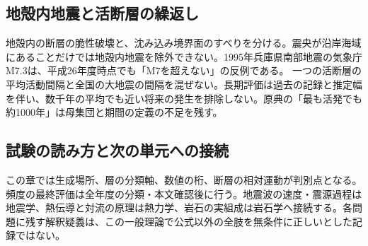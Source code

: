 \subsection{地殻内地震と活断層の繰返し}
\label{theory:interior:crust_quakes}
地殻内の断層の脆性破壊と、沈み込み境界面のすべりを分ける。震央が沿岸海域にあることだけでは地殻内地震を除外できない。1995年兵庫県南部地震の気象庁M7.3は、平成26年度時点でも「M7を超えない」の反例である。\cite{jma_hyogo_history}
一つの活断層の平均活動間隔と全国の大地震の間隔を混ぜない。長期評価は過去の記録と推定幅を伴い、数千年の平均でも近い将来の発生を排除しない。原典の「最も活発でも約1000年」は母集団と期間の定義の不足を残す。\cite{herp_longterm_intervals}

\subsection{試験の読み方と次の単元への接続}
この章では生成場所、層の分類軸、数値の桁、断層の相対運動が判別点となる。頻度の最終評価は全年度の分類・本文確認後に行う。地震波の速度・震源過程は地震学、熱伝導と対流の原理は熱力学、岩石の実組成は岩石学へ接続する。各問題に残す解釈疑義は、この一般理論で公式以外の全肢を無条件に正しいとした記録ではない。
